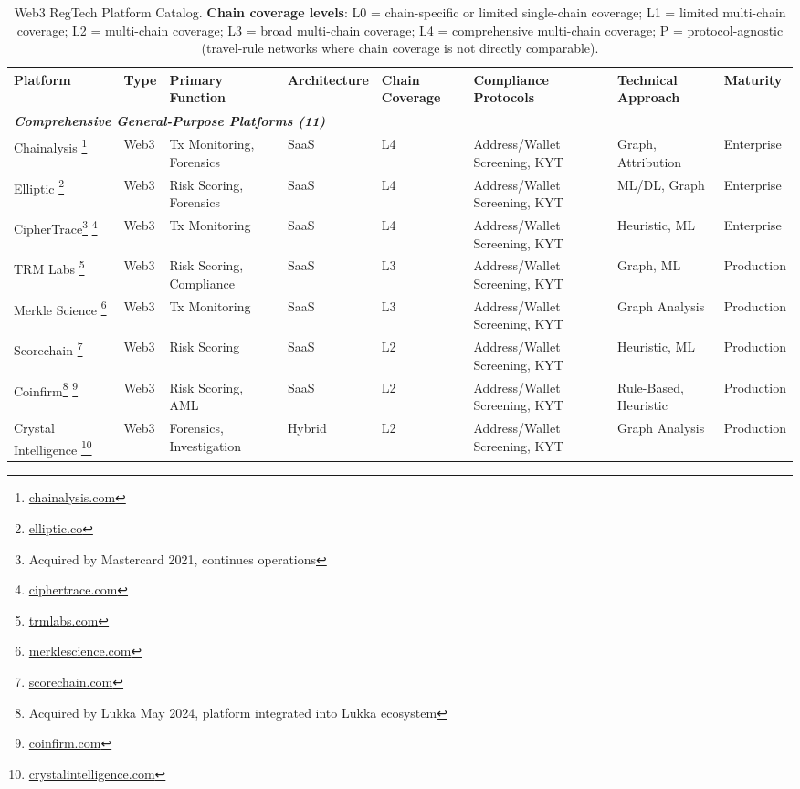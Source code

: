 \begin{table}[htbp]
\centering
\caption{Web3 RegTech Platform Catalog. \textbf{Chain coverage levels}: L0 = chain-specific or limited single-chain coverage; L1 = limited multi-chain coverage; L2 = multi-chain coverage; L3 = broad multi-chain coverage; L4 = comprehensive multi-chain coverage; P = protocol-agnostic (travel-rule networks where chain coverage is not directly comparable).}
\label{tab:platform_catalog}
\tiny
\begin{tabularx}{\textwidth}{p{1.5cm}p{0.9cm}X p{1.1cm}p{1.2cm}p{1.1cm}X p{0.9cm}}
\hline
\textbf{Platform} & \textbf{Type} & \textbf{Primary Function} & \textbf{Architecture} & \textbf{Chain Coverage} & \textbf{Compliance Protocols} & \textbf{Technical Approach} & \textbf{Maturity} \\
\hline
\multicolumn{8}{l}{\textit{\textbf{Comprehensive General-Purpose Platforms (11)}}} \\
\hline
Chainalysis \footnote{\url{chainalysis.com}} & Web3 & Tx Monitoring, Forensics & SaaS & L4 & Address/Wallet Screening, KYT & Graph, Attribution & Enterprise \\
Elliptic \footnote{\url{elliptic.co}} & Web3 & Risk Scoring, Forensics & SaaS & L4 & Address/Wallet Screening, KYT & ML/DL, Graph & Enterprise \\
CipherTrace\footnote{Acquired by Mastercard 2021, continues operations} \footnote{\url{ciphertrace.com}} & Web3 & Tx Monitoring & SaaS & L4 & Address/Wallet Screening, KYT & Heuristic, ML & Enterprise \\
TRM Labs \footnote{\url{trmlabs.com}} & Web3 & Risk Scoring, Compliance & SaaS & L3 & Address/Wallet Screening, KYT & Graph, ML & Production \\
Merkle Science \footnote{\url{merklescience.com}} & Web3 & Tx Monitoring & SaaS & L3 & Address/Wallet Screening, KYT & Graph Analysis & Production \\
Scorechain \footnote{\url{scorechain.com}} & Web3 & Risk Scoring & SaaS & L2 & Address/Wallet Screening, KYT & Heuristic, ML & Production \\
Coinfirm\footnote{Acquired by Lukka May 2024, platform integrated into Lukka ecosystem} \footnote{\url{coinfirm.com}} & Web3 & Risk Scoring, AML & SaaS & L2 & Address/Wallet Screening, KYT & Rule-Based, Heuristic & Production \\
Crystal Intelligence \footnote{\url{crystalintelligence.com}} & Web3 & Forensics, Investigation & Hybrid & L2 & Address/Wallet Screening, KYT & Graph Analysis & Production \\

\end{tabularx}
\end{table}
